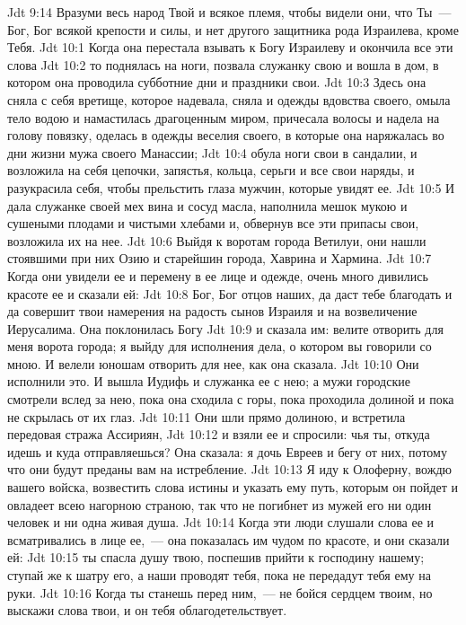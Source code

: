 \vs Jdt 9:14 Вразуми весь народ Твой и всякое племя, чтобы видели они, что Ты~--- Бог, Бог всякой крепости и силы, и нет другого защитника рода Израилева, кроме Тебя.
\vs Jdt 10:1 Когда она перестала взывать к Богу Израилеву и окончила все эти слова
\vs Jdt 10:2 то поднялась на ноги, позвала служанку свою и вошла в дом, в котором она проводила субботние дни и праздники свои.
\vs Jdt 10:3 Здесь она сняла с себя вретище, которое надевала, сняла и одежды вдовства своего, омыла тело водою и намастилась драгоценным миром, причесала волосы и надела на голову повязку, оделась в одежды веселия своего, в которые она наряжалась во дни жизни мужа своего Манассии;
\vs Jdt 10:4 обула ноги свои в сандалии, и возложила на себя цепочки, запястья, кольца, серьги и все свои наряды, и разукрасила себя, чтобы прельстить глаза мужчин, которые увидят ее.
\vs Jdt 10:5 И дала служанке своей мех вина и сосуд масла, наполнила мешок мукою и сушеными плодами и чистыми хлебами и, обвернув все эти припасы свои, возложила их на нее.
\rsbpar\vs Jdt 10:6 Выйдя к воротам города Ветилуи, они нашли стоявшими при них Озию и старейшин города, Хаврина и Хармина.
\vs Jdt 10:7 Когда они увидели ее и перемену в ее лице и одежде, очень много дивились красоте ее и сказали ей:
\vs Jdt 10:8 Бог, Бог отцов наших, да даст тебе благодать и да совершит твои намерения на радость сынов Израиля и на возвеличение Иерусалима. Она поклонилась Богу
\vs Jdt 10:9 и сказала им: велите отворить для меня ворота города; я выйду для исполнения дела, о котором вы говорили со мною. И велели юношам отворить для нее, как она сказала.
\vs Jdt 10:10 Они исполнили это. И вышла Иудифь и служанка ее с нею; а мужи городские смотрели вслед за нею, пока она сходила с горы, пока проходила долиной и пока не скрылась от их глаз.
\vs Jdt 10:11 Они шли прямо долиною, и встретила  передовая стража Ассириян,
\vs Jdt 10:12 и взяли ее и спросили: чья ты, откуда идешь и куда отправляешься? Она сказала: я дочь Евреев и бегу от них, потому что они будут преданы вам на истребление.
\vs Jdt 10:13 Я иду к Олоферну, вождю вашего войска, возвестить слова истины и указать ему путь, которым он пойдет и овладеет всею нагорною страною, так что не погибнет из мужей его ни один человек и ни одна живая душа.
\vs Jdt 10:14 Когда эти люди слушали слова ее и всматривались в лице ее,~--- она показалась им чудом по красоте, и они сказали ей:
\vs Jdt 10:15 ты спасла душу твою, поспешив прийти к господину нашему; ступай же к шатру его, а наши проводят тебя, пока не передадут тебя ему на руки.
\vs Jdt 10:16 Когда ты станешь перед ним,~--- не бойся сердцем твоим, но выскажи слова твои, и он тебя облагодетельствует.
